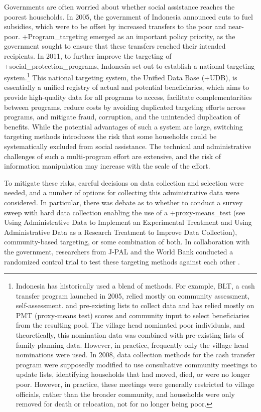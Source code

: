 \documentclass[
]{book}
\begin{document}
Governments are often worried about whether social assistance reaches the poorest households. In 2005, the government of Indonesia announced cuts to fuel subsidies, which were to be offset by increased transfers to the poor and near-poor. +Program\_targeting\textbar{} emerged as an important policy priority, as the government sought to ensure that these transfers reached their intended recipients. In 2011, to further improve the targeting of +social\_protection\_programs\textbar, Indonesia set out to establish a national targeting system.\footnote{Indonesia has historically used a blend of methods. For example, BLT, a cash transfer program launched in 2005, relied mostly on community assessment, self-assessment. and pre-existing lists to collect data and has relied mostly on PMT (proxy-means test) scores and community input to select beneficiaries from the resulting pool. The village head nominated poor individuals, and theoretically, this nomination data was combined with pre-existing lists of family planning data. However, in practice, frequently only the village head nominations were used. In 2008, data collection methods for the cash transfer program were supposedly modified to use consultative community meetings to update lists, identifying households that had moved, died, or were no longer poor. However, in practice, these meetings were generally restricted to village officials, rather than the broader community, and households were only removed for death or relocation, not for no longer being poor.} This national targeting system, the Unified Data Base (+UDB\textbar), is essentially a unified registry of actual and potential beneficiaries, which aims to provide high-quality data for all programs to access, facilitate complementarities between programs, reduce costs by avoiding duplicated targeting efforts across programs, and mitigate fraud, corruption, and the unintended duplication of benefits. While the potential advantages of such a system are large, switching targeting methods introduces the risk that some households could be systematically excluded from social assistance. The technical and administrative challenges of such a multi-program effort are extensive, and the risk of information manipulation may increase with the scale of the effort.

To mitigate these risks, careful decisions on data collection and selection were needed, and a number of options for collecting this administrative data were considered. In particular, there was debate as to whether to conduct a survey sweep with hard data collection enabling the use of a +proxy-means\_test\textbar{} (see Using Administrative Data to Implement an Experimental Treatment and Using Administrative Data as a Research Treatment to Improve Data Collection), community-based targeting, or some combination of both. In collaboration with the government, researchers from J-PAL and the World Bank conducted a randomized control trial to test these targeting methods against each other \citep{alatas2012}.
\end{document}

